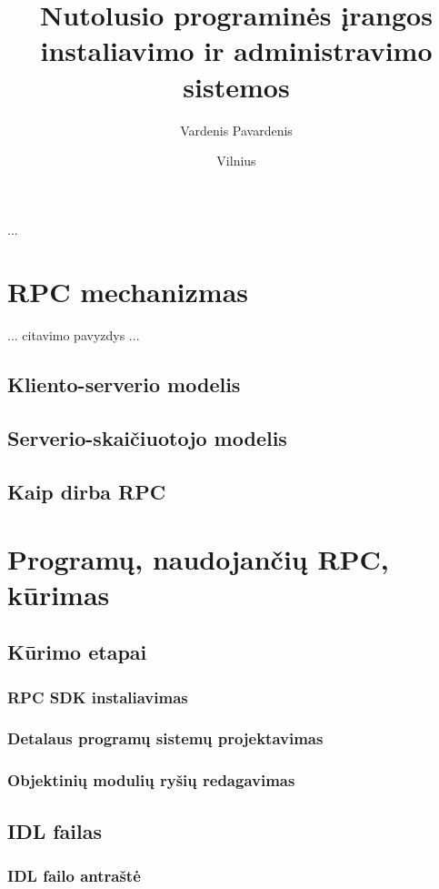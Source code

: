 \documentclass[12pt, a4paper, lithuanian]{article}
\title{Nutolusio programinės įrangos instaliavimo ir administravimo sistemos}
\author{Vardenis Pavardenis}
\date{Vilnius\\ \the\year}
\begin{document}
\maketitle

\tableofcontents

...

\section{RPC mechanizmas}
... citavimo pavyzdys \cite{Banerjee1997} ...

\subsection{Kliento-serverio modelis}
\subsection{Serverio-skaičiuotojo modelis}
\subsection{Kaip dirba RPC}

\section{Programų, naudojančių RPC, kūrimas}
\subsection{Kūrimo etapai}
\subsubsection{RPC SDK instaliavimas}
\subsubsection{Detalaus programų sistemų projektavimas}
\subsubsection{Objektinių modulių ryšių redagavimas}
\subsection{IDL failas}
\subsubsection{IDL failo antraštė}
\end{document}
